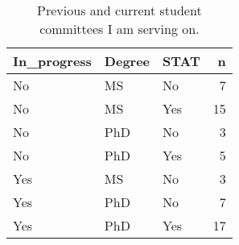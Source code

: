 \begin{table}[h]
\centering
\begin{tabular}{lllr}
  \hline
In\_progress & Degree & STAT & n \\ 
  \hline
No & MS & No &   7 \\ 
  No & MS & Yes &  15 \\ 
  No & PhD & No &   3 \\ 
  No & PhD & Yes &   5 \\ 
  Yes & MS & No &   3 \\ 
  Yes & PhD & No &   7 \\ 
  Yes & PhD & Yes &  17 \\ 
   \hline
\end{tabular}
\caption{Previous and current student committees I am serving on.} 
\label{tab:committees}
\end{table}
